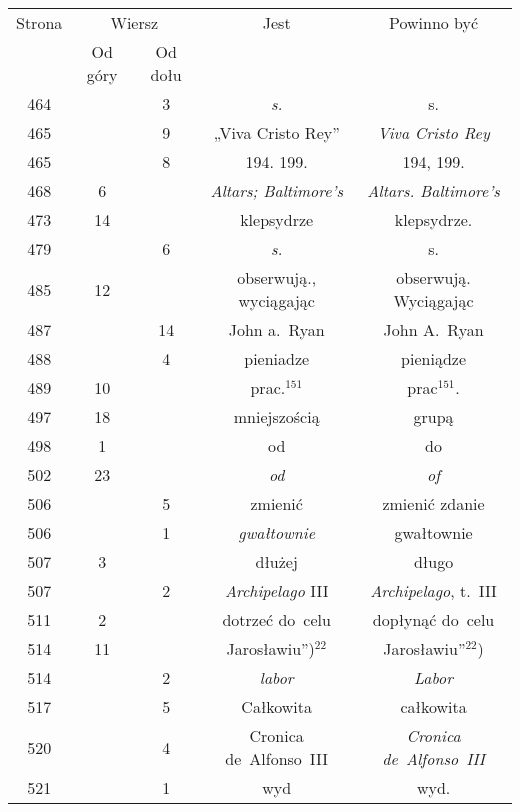 \documentclass[a4paper,11pt]{article}
\begin{document}
\begin{center}
  \newpage

  \begin{tabular}{|c|c|c|c|c|}
    \hline
    Strona & \multicolumn{2}{c|}{Wiersz} & Jest
                              & Powinno być \\ \cline{2-3}
    & Od góry & Od dołu & & \\
    \hline
    464 & & \hphantom{0}3 & \textit{s.} & s. \\
    465 & & \hphantom{0}9 & „Viva Cristo Rey” & \textit{Viva Cristo Rey} \\
    465 & & \hphantom{0}8 & 194. 199. & 194, 199. \\
    468 & \hphantom{0}6 & & \textit{Altars; Baltimore's}
    & \textit{Altars. Baltimore's} \\
    473 & 14 & & klepsydrze & klepsydrze. \\
    479 & & \hphantom{0}6 & \textit{s.} & s. \\
    485 & 12 & & obserwują., wyciągając & obserwują. Wyciągając \\
    487 & & 14 & John a.~Ryan & John A.~Ryan \\
    488 & & \hphantom{0}4 & pieniadze & pieniądze \\
    489 & 10 & & prac.$^{151}$ & prac$^{151}$. \\
    497 & 18 & & mniejszością & grupą \\
    498 & \hphantom{0}1 & & od & do \\
    502 & 23 & & \textit{od} & \textit{of} \\
    506 & & \hphantom{0}5 & zmienić & zmienić zdanie \\
    506 & & \hphantom{0}1 & \textit{gwałtownie} & gwałtownie \\
    507 & \hphantom{0}3 & & dłużej & długo \\
    507 & & \hphantom{0}2 & \textit{Archipelago} III
    & \textit{Archipelago}, t.~III \\
    511 & \hphantom{0}2 & & dotrzeć do~celu & dopłynąć do~celu \\
    514 & 11 & & Jarosławiu”)$^{ 22 }$ & Jarosławiu”$^{ 22 }$) \\
    514 & & \hphantom{0}2 & \textit{labor} & \textit{Labor} \\
    517 & & \hphantom{0}5 & Całkowita & całkowita \\
    520 & & \hphantom{0}4 & Cronica de~Alfonso~III
    & \textit{Cronica de~Alfonso~III} \\
    521 & & \hphantom{0}1 & wyd & wyd. \\

\end{tabular}
\end{center}
\end{document}
